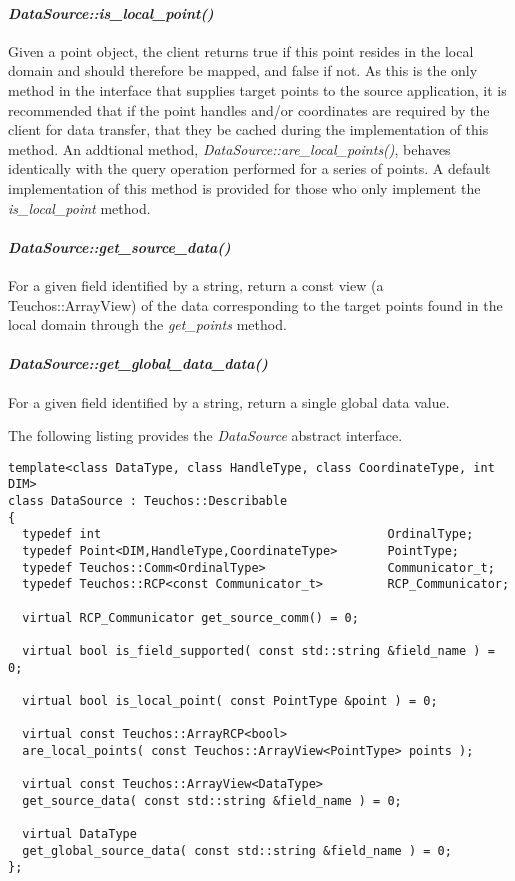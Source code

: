 \documentclass[letterpaper]{article}
\begin{document}
\paragraph{\sl DataSource::is\_local\_point()}
Given a point object, the client returns true if this point resides in
the local domain and should therefore be mapped, and false if not. As
this is the only method in the interface that supplies target points
to the source application, it is recommended that if the point handles
and/or coordinates are required by the client for data transfer, that
they be cached during the implementation of this method. An addtional
method, {\sl DataSource::are\_local\_points()}, behaves identically
with the query operation performed for a series of points. A default
implementation of this method is provided for those who only implement
the {\sl is\_local\_point} method.

\paragraph{\sl DataSource::get\_source\_data()}
For a given field identified by a string, return a const view (a
Teuchos::ArrayView) of the data corresponding to the target points
found in the local domain through the {\sl get\_points} method.

\paragraph{\sl DataSource::get\_global\_data\_data()}
For a given field identified by a string, return a single global data
value.

The following listing provides the {\sl DataSource} abstract
interface. 

\begin{lstlisting}
template<class DataType, class HandleType, class CoordinateType, int DIM>
class DataSource : Teuchos::Describable
{
  typedef int                                        OrdinalType;
  typedef Point<DIM,HandleType,CoordinateType>       PointType;
  typedef Teuchos::Comm<OrdinalType>                 Communicator_t;
  typedef Teuchos::RCP<const Communicator_t>         RCP_Communicator;

  virtual RCP_Communicator get_source_comm() = 0;

  virtual bool is_field_supported( const std::string &field_name ) = 0;

  virtual bool is_local_point( const PointType &point ) = 0;

  virtual const Teuchos::ArrayRCP<bool> 
  are_local_points( const Teuchos::ArrayView<PointType> points );

  virtual const Teuchos::ArrayView<DataType> 
  get_source_data( const std::string &field_name ) = 0;

  virtual DataType 
  get_global_source_data( const std::string &field_name ) = 0;
};
\end{lstlisting}
\end{document}

